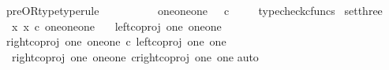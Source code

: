 \begin{isabellebody}
\isanewline
{}\isamarkupfalse%
\ pre{\isacharunderscore}{\kern0pt}OR{\isacharunderscore}{\kern0pt}type{\isacharbrackleft}{\kern0pt}type{\isacharunderscore}{\kern0pt}rule{\isacharbrackright}{\kern0pt}{\isacharcolon}{\kern0pt}\ \isanewline
\ \ {\isachardoublequoteopen}{\isasymlangle}{\isasymt}{\isacharcomma}{\kern0pt}\ {\isasymt}{\isasymrangle}{\isasymamalg}\ {\isacharparenleft}{\kern0pt}{\isasymlangle}{\isasymt}{\isacharcomma}{\kern0pt}\ {\isasymf}{\isasymrangle}\ {\isasymamalg}{\isasymlangle}{\isasymf}{\isacharcomma}{\kern0pt}\ {\isasymt}{\isasymrangle}{\isacharparenright}{\kern0pt}\ {\isacharcolon}{\kern0pt}\ one{\isasymCoprod}{\isacharparenleft}{\kern0pt}one{\isasymCoprod}one{\isacharparenright}{\kern0pt}\ {\isasymrightarrow}\ {\isasymOmega}\ {\isasymtimes}\isactrlsub c\ {\isasymOmega}{\isachardoublequoteclose}\isanewline
%
\isadelimproof
\ \ %
\endisadelimproof
%
\isatagproof
{}\isamarkupfalse%
\ typecheck{\isacharunderscore}{\kern0pt}cfuncs%
\endisatagproof
{\isafoldproof}%
%
\isadelimproof
\isanewline
%
\endisadelimproof
\isanewline
{}\isamarkupfalse%
\ set{\isacharunderscore}{\kern0pt}three{\isacharcolon}{\kern0pt}\ \isanewline
\ \ {\isachardoublequoteopen}{\isacharbraceleft}{\kern0pt}x{\isachardot}{\kern0pt}\ x\ {\isasymin}\isactrlsub c\ {\isacharparenleft}{\kern0pt}one{\isasymCoprod}{\isacharparenleft}{\kern0pt}one{\isasymCoprod}one{\isacharparenright}{\kern0pt}{\isacharparenright}{\kern0pt}{\isacharbraceright}{\kern0pt}\ {\isacharequal}{\kern0pt}\ {\isacharbraceleft}{\kern0pt}\isanewline
\ {\isacharparenleft}{\kern0pt}left{\isacharunderscore}{\kern0pt}coproj\ one\ {\isacharparenleft}{\kern0pt}one{\isasymCoprod}one{\isacharparenright}{\kern0pt}{\isacharparenright}{\kern0pt}\ {\isacharcomma}{\kern0pt}\ \isanewline
\ {\isacharparenleft}{\kern0pt}right{\isacharunderscore}{\kern0pt}coproj\ one\ {\isacharparenleft}{\kern0pt}one{\isasymCoprod}one{\isacharparenright}{\kern0pt}\ {\isasymcirc}\isactrlsub c\ left{\isacharunderscore}{\kern0pt}coproj\ one\ one{\isacharparenright}{\kern0pt}{\isacharcomma}{\kern0pt}\ \isanewline
\ \ right{\isacharunderscore}{\kern0pt}coproj\ one\ {\isacharparenleft}{\kern0pt}one{\isasymCoprod}one{\isacharparenright}{\kern0pt}\ {\isasymcirc}\isactrlsub c{\isacharparenleft}{\kern0pt}right{\isacharunderscore}{\kern0pt}coproj\ one\ one{\isacharparenright}{\kern0pt}{\isacharbraceright}{\kern0pt}{\isachardoublequoteclose}\isanewline
%
\isadelimproof
%
\endisadelimproof
%
\isatagproof
{}\isamarkupfalse%
{\isacharparenleft}{\kern0pt}auto{\isacharparenright}{\kern0pt}\isanewline

\end{isabellebody}
